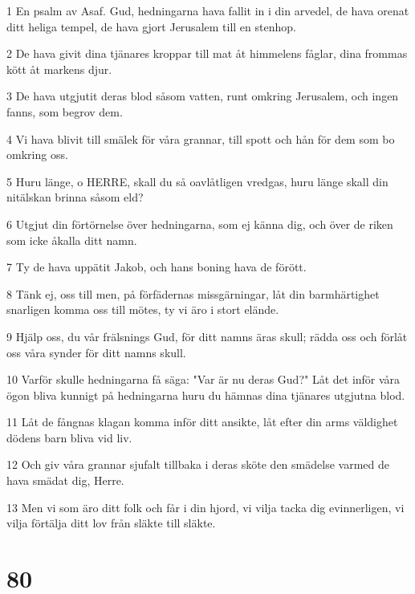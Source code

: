 \par 1 En psalm av Asaf. Gud, hedningarna hava fallit in i din arvedel, de hava orenat ditt heliga tempel, de hava gjort Jerusalem till en stenhop.
\par 2 De hava givit dina tjänares kroppar till mat åt himmelens fåglar, dina frommas kött åt markens djur.
\par 3 De hava utgjutit deras blod såsom vatten, runt omkring Jerusalem, och ingen fanns, som begrov dem.
\par 4 Vi hava blivit till smälek för våra grannar, till spott och hån för dem som bo omkring oss.
\par 5 Huru länge, o HERRE, skall du så oavlåtligen vredgas, huru länge skall din nitälskan brinna såsom eld?
\par 6 Utgjut din förtörnelse över hedningarna, som ej känna dig, och över de riken som icke åkalla ditt namn.
\par 7 Ty de hava uppätit Jakob, och hans boning hava de förött.
\par 8 Tänk ej, oss till men, på förfädernas missgärningar, låt din barmhärtighet snarligen komma oss till mötes, ty vi äro i stort elände.
\par 9 Hjälp oss, du vår frälsnings Gud, för ditt namns äras skull; rädda oss och förlåt oss våra synder för ditt namns skull.
\par 10 Varför skulle hedningarna få säga: "Var är nu deras Gud?" Låt det inför våra ögon bliva kunnigt på hedningarna huru du hämnas dina tjänares utgjutna blod.
\par 11 Låt de fångnas klagan komma inför ditt ansikte, låt efter din arms väldighet dödens barn bliva vid liv.
\par 12 Och giv våra grannar sjufalt tillbaka i deras sköte den smädelse varmed de hava smädat dig, Herre.
\par 13 Men vi som äro ditt folk och får i din hjord, vi vilja tacka dig evinnerligen, vi vilja förtälja ditt lov från släkte till släkte.

\chapter{80}

